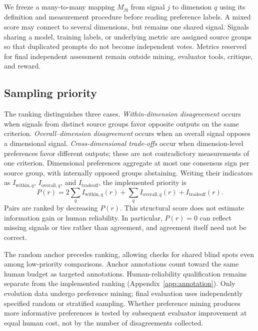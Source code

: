 We freeze a many-to-many mapping $M_{jq}$ from signal $j$ to dimension $q$ using its definition and measurement procedure before reading preference labels.
A mixed score may connect to several dimensions, but remains one shared signal.
Signals sharing a model, training labels, or underlying metric are assigned source groups so that duplicated prompts do not become independent votes.
Metrics reserved for final independent assessment remain outside mining, evaluator tools, critique, and reward.

\subsection{Sampling priority}

The ranking distinguishes three cases.
\emph{Within-dimension disagreement} occurs when signals from distinct source groups favor opposite outputs on the same criterion.
\emph{Overall--dimension disagreement} occurs when an overall signal opposes a dimensional signal.
\emph{Cross-dimensional trade-offs} occur when dimension-level preferences favor different outputs; these are not contradictory measurements of one criterion.
Dimensional preferences aggregate at most one consensus sign per source group, with internally opposed groups abstaining.
Writing their indicators as $I_{\mathrm{within},q}$, $I_{\mathrm{overall},q}$, and $I_{\mathrm{tradeoff}}$, the implemented priority is
\begin{equation}
 P(r)=2\sum_q I_{\mathrm{within},q}(r)
      +\sum_q I_{\mathrm{overall},q}(r)
      +I_{\mathrm{tradeoff}}(r).
 \label{eq:conflict}
\end{equation}
Pairs are ranked by decreasing $P(r)$.
This structural score does not estimate information gain or human reliability.
In particular, $P(r)=0$ can reflect missing signals or ties rather than agreement, and agreement itself need not be correct.

The random anchor precedes ranking, allowing checks for shared blind spots even among low-priority comparisons.
Anchor annotations count toward the same human budget as targeted annotations.
Human-reliability qualification remains separate from the implemented ranking (Appendix~\ref{app:annotation}).
Only evolution data undergo preference mining; final evaluation uses independently specified random or stratified sampling.
Whether preference mining produces more informative preferences is tested by subsequent evaluator improvement at equal human cost, not by the number of disagreements collected.

